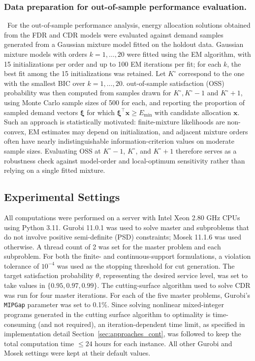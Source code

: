 \documentclass[opre,sglanonrev]{informs4}
\newcommand{\bxi}{\bm{\xi}}
\newcommand{\bx}{\bm{x}}
\begin{document}
{ \subsubsection{Data preparation for out-of-sample performance evaluation.}\label{appndx: OSS-data}\,  For the out-of-sample performance analysis, energy allocation solutions obtained from the FDR and CDR models were evaluated against demand samples generated from a Gaussian mixture model fitted on the holdout data. Gaussian mixture models with orders \(k=1,\ldots,20\) were fitted using the EM algorithm, with 15 initializations per order and up to 100 EM iterations per fit; for each \(k\), the best fit among the 15 initializations was retained.  Let \(K^\circ\) correspond to the one with the smallest BIC over \(k=1,\ldots,20\). out-of-sample satisfaction (OSS) probability was then computed from samples drawn for \(K^\circ, K^\circ-1\) and \(K^\circ+1\), using Monte Carlo sample sizes of 500 for each, and reporting the proportion of sampled demand vectors \(\bxi\) for which \(\bxi^\top \bx \ge E_{\min}\) with candidate allocation $\bx$. Such an approach is statistically motivated: finite-mixture likelihoods are non-convex, EM estimates may depend on initialization, and adjacent mixture orders often have nearly indistinguishable information-criterion values on moderate sample sizes. Evaluating OSS at \(K^\circ-1\), \(K^\circ\), and \(K^\circ+1\) therefore serves as a robustness check against model-order and local-optimum sensitivity rather than relying on a single fitted mixture.

\subsection{Experimental Settings}\label{sec: compt-setup}
All computations were performed on a server with Intel Xeon 2.80 GHz CPUs using Python 3.11. Gurobi 11.0.1 was used to solve master and subproblems that do not involve positive semi-definite (PSD) constraints; Mosek 11.1.6 was used otherwise. A thread count of 2 was set for the master problem and each subproblem. For both the finite- and continuous-support formulations, a violation tolerance of $10^{-4}$
 was used as the stopping threshold for cut generation. The target satisfaction probability \(\theta\), representing the desired service level, was set to take values in \(\{0.95,0.97,0.99\}\). 
 The cutting-surface algorithm used to solve CDR was run for four master iterations. For each of the five master problems, Gurobi’s \texttt{MIPGap} parameter was set to 0.1\%. Since solving nonlinear mixed-integer programs generated in the cutting surface algorithm to optimality is time-consuming (and not required), an iteration-dependent time limit, as specified in implementation detail Section~\ref{sec:approaches_cont}, was followed to keep the total computation time $\leq 24$ hours for each instance.  All other Gurobi and Mosek settings were kept at their default values.  

}
\end{document}
